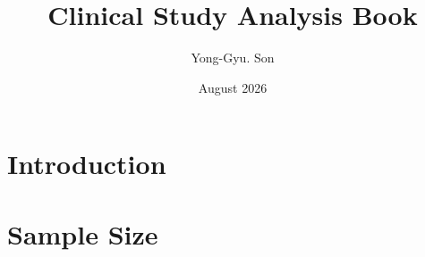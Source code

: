 \documentclass[12pt]{report}
\title{Clinical Study Analysis Book}
\author{Yong-Gyu. Son}
\date{August 2026}
\begin{document}
\maketitle
\tableofcontents

\newpage
\chapter{Introduction}


\chapter{Sample Size}


\end{document}
